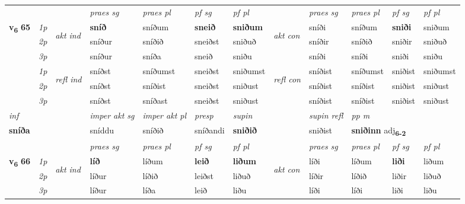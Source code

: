 \begin{longtable}[l]{X>{\footnotesize\itshape}llXXXXlXXXX}
 & &   & \textit{praes sg}  & \textit{praes pl}    & \textit{ pf sg} & \textit{pf pl} & & \textit{praes sg}  & \textit{praes pl}    & \textit{pf sg} & \textit{pf pl }  \\ \cmidrule{4-7} \cmidrule{9-12}
 \multirow{2}{*}{{{\textbf{v{\textsubscript{6}}} \Large{\textbf{65}}}}}  & 1p & \multirow{3}{*}{\begin{turn}{90}\textit{akt ind}\end{turn}} & \textbf{sníð} & sníðum & \textbf{sneið} & \textbf{sniðum} & \multirow{3}{*}{\begin{turn}{90}\textit{akt con}\end{turn}} &sníði & sníðum & \textbf{sniði} & sniðum\\*
 & 2p &  &  sníður  & sníðið & sneiðst & sniðuð & & sníðir & sníðið & sniðir & sniðuð \\*
 & 3p &  & sníður & sníða & sneið & sniðu & & sníði & sníði& sniði & sniðu \\*
\cmidrule{4-7} \cmidrule{9-12}
 & 1p & \multirow{3}{*}{\begin{turn}{90}\textit{refl ind}\end{turn}}  & sníðst & sníðumst & sneiðst & sniðumst & \multirow{3}{*}{\begin{turn}{90}\textit{refl con}\end{turn}}  &sníðist & sníðumst & sniðist & sniðumst \\*
 & 2p &  & sníðst & sníðist & sneiðst & sniðust & &sníðist & sníðist & sniðist & sniðust \\*
 & 3p  & & sníðst & sníðast & sneiðst & sniðust & & sníðist & sníðist& sniðist & sniðust \\*
\cmidrule{4-7} \cmidrule{9-12}

   {\textit{inf}} & &  & \textit{imper akt sg} & \textit{imper akt pl}   & \textit{presp} & \textit{supin} && \textit{supin refl} & \textit{pp m} \\*
  {\textbf{sníða}} & && sníddu  & sníðið   & sníðandi &  \textbf{sniðið} && sniðist & \multicolumn{2}{l}{\textbf{sniðinn} adj\textbf{\textsubscript{6-2}}} \\*

\midrule

 & &   & \textit{praes sg}  & \textit{praes pl}    & \textit{ pf sg} & \textit{pf pl} & & \textit{praes sg}  & \textit{praes pl}    & \textit{pf sg} & \textit{pf pl }  \\ \cmidrule{4-7} \cmidrule{9-12}
 \multirow{2}{*}{{{\textbf{v{\textsubscript{6}}} \Large{\textbf{66}}}}}  & 1p & \multirow{3}{*}{\begin{turn}{90}\textit{akt ind}\end{turn}} & \textbf{líð} & líðum & \textbf{leið} & \textbf{liðum} & \multirow{3}{*}{\begin{turn}{90}\textit{akt con}\end{turn}} &líði & líðum & \textbf{liði} & liðum\\*
 & 2p &  &  líður  & líðið & leiðst & liðuð & & líðir & líðið & liðir & liðuð \\*
 & 3p &  & líður & líða & leið & liðu & & líði & líði& liði & liðu \\*
\cmidrule{4-7} \cmidrule{9-12}


\end{longtable}
